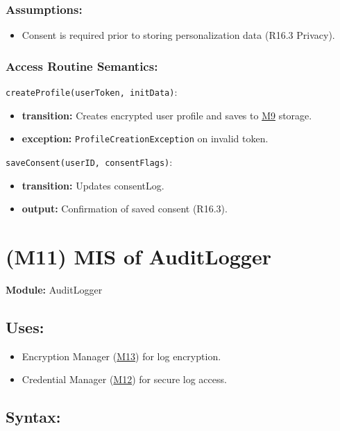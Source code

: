 \documentclass[12pt, titlepage]{article}
\begin{document}
\subsubsection{Assumptions:}
\begin{itemize}
\item Consent is required prior to storing personalization data (R16.3 Privacy).
\end{itemize}

\subsubsection{Access Routine Semantics:}

\noindent\texttt{createProfile(userToken, initData)}:
\begin{itemize}
\item \textbf{transition:} Creates encrypted user profile and saves to \hyperref[M9]{M9} storage.
\item \textbf{exception:} \texttt{ProfileCreationException} on invalid token.
\end{itemize}

\noindent\texttt{saveConsent(userID, consentFlags)}:
\begin{itemize}
\item \textbf{transition:} Updates consentLog.
\item \textbf{output:} Confirmation of saved consent (R16.3).
\end{itemize}


\section{(M11) MIS of AuditLogger} \label{M11}

\textbf{Module:} AuditLogger

\subsection{Uses:}
\begin{itemize}
\item Encryption Manager (\hyperref[M13]{M13}) for log encryption.
\item Credential Manager (\hyperref[M12]{M12}) for secure log access.
\end{itemize}

\subsection{Syntax:}
\end{document}
